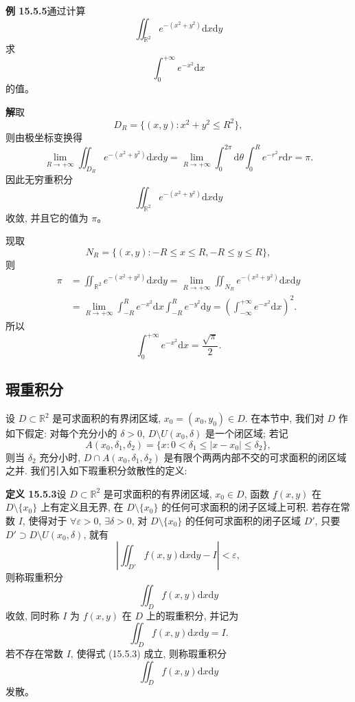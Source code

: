 \documentclass[UTF8,12pt,a4paper,fontset=fandol]{ctexart}
\begin{document}
\noindent\textbf{例 15.5.5}\quad 通过计算
\[
  \iint_{\mathbb R^2}e^{-(x^2+y^2)}\mathrm dx\mathrm dy
\]
求
\[
  \int_0^{+\infty}e^{-x^2}\mathrm dx
\]
的值。

\noindent\textbf{解}\quad 取
\[
  D_R=\{(x,y):x^2+y^2\leqslant R^2\},
\]
则由极坐标变换得
\[
  \lim_{R\to+\infty}\iint_{D_R}e^{-(x^2+y^2)}\mathrm dx\mathrm dy
  =\lim_{R\to+\infty}\int_0^{2\pi}\mathrm d\theta\int_0^R e^{-r^2}r\mathrm dr=\pi.
\]
因此无穷重积分
\[
  \iint_{\mathbb R^2}e^{-(x^2+y^2)}\mathrm dx\mathrm dy
\]
收敛, 并且它的值为 $\pi$。

现取
\[
  N_R=\{(x,y):-R\leqslant x\leqslant R,-R\leqslant y\leqslant R\},
\]
则
\[
\begin{aligned}
  \pi&=\iint_{\mathbb R^2}e^{-(x^2+y^2)}\mathrm dx\mathrm dy
  =\lim_{R\to+\infty}\iint_{N_R}e^{-(x^2+y^2)}\mathrm dx\mathrm dy\\
  &=\lim_{R\to+\infty}\int_{-R}^R e^{-x^2}\mathrm dx
  \int_{-R}^R e^{-y^2}\mathrm dy
  =\left(\int_{-\infty}^{+\infty}e^{-x^2}\mathrm dx\right)^2.
\end{aligned}
\]
所以
\[
  \int_0^{+\infty}e^{-x^2}\mathrm dx=\frac{\sqrt\pi}2.
\]

\subsection{瑕重积分}

设 $D\subset\mathbb R^2$ 是可求面积的有界闭区域, $x_0=(x_0,y_0)\in D$. 在本节中, 我们对 $D$ 作如下假定: 对每个充分小的 $\delta>0$, $D\setminus U(x_0,\delta)$ 是一个闭区域; 若记
\[
  A(x_0,\delta_1,\delta_2)=\{x:0<\delta_1\leqslant |x-x_0|\leqslant\delta_2\},
\]
则当 $\delta_2$ 充分小时, $D\cap A(x_0,\delta_1,\delta_2)$ 是有限个两两内部不交的可求面积的闭区域之并. 我们引入如下瑕重积分敛散性的定义:

\noindent\textbf{定义 15.5.3}\quad 设 $D\subset\mathbb R^2$ 是可求面积的有界闭区域, $x_0\in D$, 函数 $f(x,y)$ 在 $D\setminus\{x_0\}$ 上有定义且无界, 在 $D\setminus\{x_0\}$ 的任何可求面积的闭子区域上可积. 若存在常数 $I$, 使得对于 $\forall\varepsilon>0$, $\exists\delta>0$, 对 $D\setminus\{x_0\}$ 的任何可求面积的闭子区域 $D'$, 只要 $D'\supset D\setminus U(x_0,\delta)$, 就有
\begin{equation}
  \left|\iint_{D'}f(x,y)\mathrm dx\mathrm dy-I\right|<\varepsilon,
  \tag{15.5.3}
\end{equation}
则称瑕重积分
\[
  \iint_D f(x,y)\mathrm dx\mathrm dy
\]
收敛, 同时称 $I$ 为 $f(x,y)$ 在 $D$ 上的瑕重积分, 并记为
\[
  \iint_D f(x,y)\mathrm dx\mathrm dy=I.
\]
若不存在常数 $I$, 使得式 (15.5.3) 成立, 则称瑕重积分
\[
  \iint_D f(x,y)\mathrm dx\mathrm dy
\]
发散。
\end{document}
